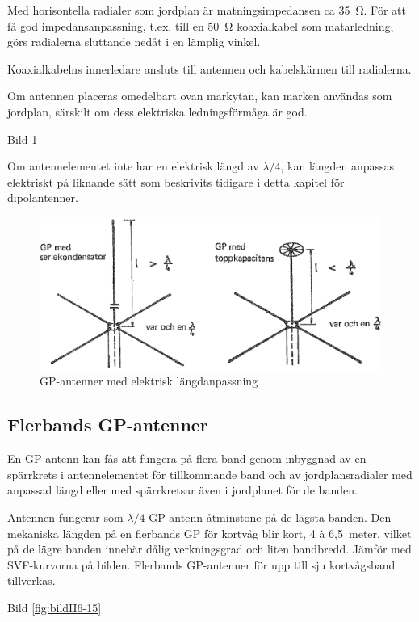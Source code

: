 Med horisontella radialer som jordplan är matningsimpedansen ca 35~Ω.
För att få god impedansanpassning, t.ex. till en 50~Ω koaxialkabel
som matarledning, görs radialerna sluttande nedåt i en lämplig vinkel.

Koaxialkabelns innerledare ansluts till antennen och kabelskärmen till
radialerna.

Om antennen placeras omedelbart ovan markytan, kan marken användas som
jordplan, särskilt om dess elektriska ledningsförmåga är god.

Bild \ref{fig:bildII6-14}

Om antennelementet inte har en elektrisk längd av \(\lambda/4\), kan
längden anpassas elektriskt på liknande sätt som beskrivits tidigare i
detta kapitel för dipolantenner.

\begin{figure}
  \includegraphics[width=\textwidth]{images/bild_2_6-14.png}
  \caption{GP-antenner med elektrisk längdanpassning}
  \label{fig:bildII6-14}
\end{figure}

\subsection{Flerbands GP-antenner}

En GP-antenn kan fås att fungera på flera band genom inbyggnad av en
spärrkrets i antennelementet för tillkommande band och av
jordplansradialer med anpassad längd eller med spärrkretsar även i
jordplanet för de banden.

Antennen fungerar som \(\lambda/4\) GP-antenn åtminstone på de lägsta
banden. Den mekaniska längden på en flerbands GP för kortvåg blir
kort, 4 à 6,5~meter, vilket på de lägre banden innebär dålig
verkningsgrad och liten bandbredd. Jämför med SVF-kurvorna på
bilden. Flerbands GP-antenner för upp till sju kortvågsband
tillverkas.

Bild \ref{fig:bildII6-15}


